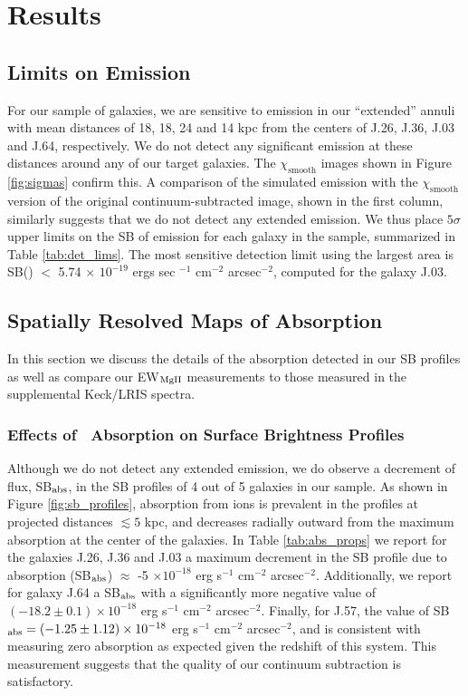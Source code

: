 \documentclass[trackchanges,twocolumn]{aastex62}
\begin{document}
\section{Results}\label{sec:results}

\subsection{Limits on  Emission}
For our sample of galaxies, we are sensitive to emission in our ``extended'' annuli with mean distances of 18, 18, 24 and 14 kpc from the centers of J.26, J.36, J.03 and J.64, respectively.
 We do not detect any significant  emission at these distances around any of our target galaxies. The $\chi_{\text{smooth}}$ images shown in Figure \ref{fig:sigmas} confirm this. A comparison of the simulated emission with the $\chi_{\text{smooth}}$ version of the original continuum-subtracted image, shown in the first column, similarly suggests that we do not detect any extended  emission. We thus place $5\sigma$ upper limits on the SB of  emission for each galaxy in the sample, summarized in Table \ref{tab:det_lims}. The most sensitive detection limit using the largest area is SB() $<$ 5.74 $\times$ $10^{-19}$ ergs sec $^{-1}$ cm$^{-2}$ arcsec$^{-2}$, computed for the galaxy J.03. 

\subsection{Spatially Resolved Maps of  Absorption}
In this section we discuss the details of the absorption detected in our SB profiles as well as compare our EW$_{\rm{MgII}}$ measurements to those measured in the supplemental Keck/LRIS spectra. 

\subsubsection{Effects of \ Absorption on Surface Brightness Profiles} \label{subsubsec:SBprofiles}
Although we do not detect any extended  emission, we do observe a decrement of flux, SB$_{\rm abs}$, in the SB profiles of 4 out of 5 galaxies in our sample. As shown in Figure \ref{fig:sb_profiles}, absorption from  ions is prevalent in the profiles at projected distances $\lesssim5$ kpc, and decreases radially outward from the maximum absorption at the center of the galaxies. In Table \ref{tab:abs_props} we report for the galaxies J.26, J.36 and J.03 a maximum decrement in the SB profile due to absorption (SB$_{\rm abs}$) $\approx$ -5 $\times10^{-18}$ erg s$^{-1}$ cm$^{-2}$ arcsec$^{-2}$. Additionally, we report for galaxy J.64 a SB$_{\rm abs}$ with a significantly more negative value of $(-18.2 \pm 0.1) \times10^{-18}$ erg s$^{-1}$ cm$^{-2}$ arcsec$^{-2}$. Finally, for J.57, %
the value of SB$_{\rm abs} = (-1.25 \pm 1.12) \times10^{-18}$ erg s$^{-1}$ cm$^{-2}$ arcsec$^{-2}$, and is consistent with measuring zero absorption as expected given the redshift of this system. This measurement suggests that the quality of our continuum subtraction is satisfactory.
\end{document}
